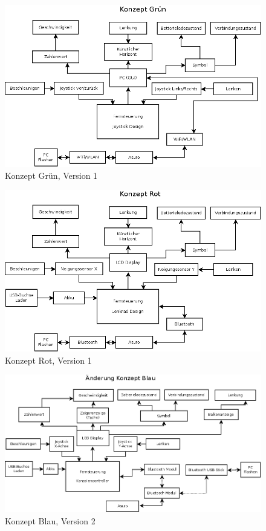 \begin{figure}
	\centering
	\includegraphics[width=\textwidth]{konzepte_v1/Konzept_Gruen.png}
	\caption{Konzept Grün, Version 1}
	\label{fig:gruen_v1}
\end{figure}

\begin{figure}
	\centering
	\includegraphics[width=\textwidth]{konzepte_v1/Konzept_Rot.png}
	\caption{Konzept Rot, Version 1}
	\label{fig:rot_v1}
\end{figure}

\begin{figure}
	\centering
	\includegraphics[width=\textwidth]{konzepte_v2/Konzept_Blau.png}
	\caption{Konzept Blau, Version 2}
	\label{fig:blau_v2}
\end{figure}

